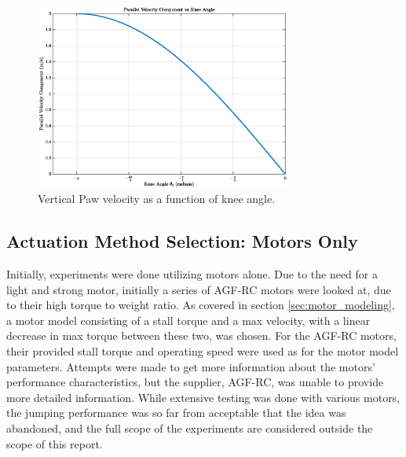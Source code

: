 \begin{figure}[h]
    \centering
    \includegraphics[width=0.75\textwidth]{Images/vertical_jacobian_velocity.eps}
    \caption{Vertical Paw velocity as a function of knee angle.}
    \label{fig:vertical_jacobian_velocity}
\end{figure}

\subsection{Actuation Method Selection: Motors Only}

Initially, experiments were done utilizing motors alone. Due to the need for a light and strong motor, initially a series of AGF-RC motors were looked at, due to their high torque to weight ratio. As covered in section \ref{sec:motor_modeling}, a motor model consisting of a stall torque and a max velocity, with a linear decrease in max torque between these two, was chosen. For the AGF-RC motors, their provided stall torque and operating speed were used as for the motor model parameters. Attempts were made to get more information about the motors' performance characteristics, but the supplier, AGF-RC, was unable to provide more detailed information. While extensive testing was done with various motors, the jumping performance was so far from acceptable that the idea was abandoned, and the full scope of the experiments are considered outside the scope of this report.

